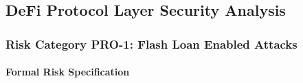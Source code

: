 \subsection{DeFi Protocol Layer Security Analysis}
\label{sec:results_defi_protocol}


\subsubsection{Risk Category PRO-1: Flash Loan Enabled Attacks}

\paragraph{Formal Risk Specification}


